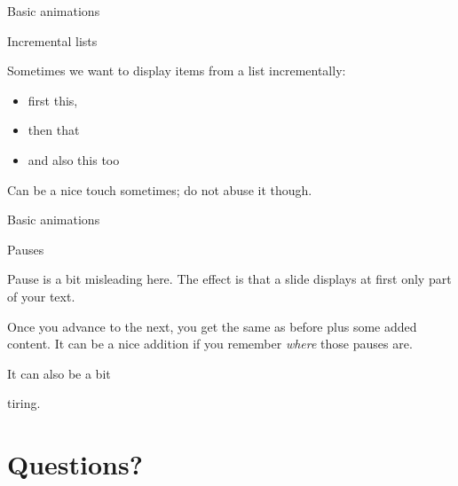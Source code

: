 \documentclass[10pt,compress]{beamer}
\begin{document}
\begin{frame}{Basic animations}

\begin{block}{Incremental lists}

Sometimes we want to display items from a list incrementally:

\begin{itemize}[<+->]
\itemsep1pt\parskip0pt
\item
  first this,
\item
  then that
\item
  and also this too
\end{itemize}

Can be a nice touch sometimes; do not abuse it though.

\end{block}

\end{frame}

\begin{frame}{Basic animations}

\begin{block}{Pauses}

Pause is a bit misleading here. The effect is that a slide displays at
first only part of your text.

\pause

Once you advance to the next, you get the same as before plus some added
content. It can be a nice addition if you remember \emph{where} those
pauses are.

\pause

It can also be a bit

\pause

tiring.

\end{block}

\end{frame}

\section{Questions?}\label{questions}
\end{document}
